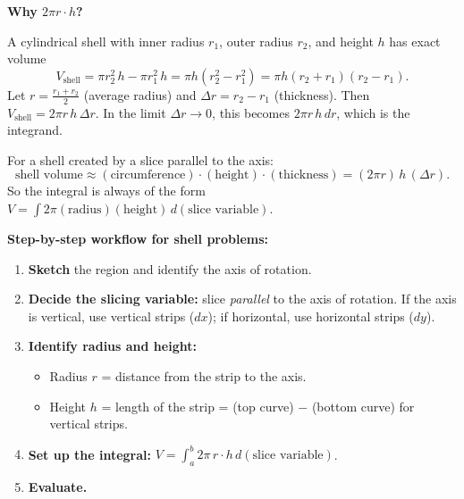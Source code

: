 \textbf{Why $2\pi r\cdot h$?}

A cylindrical shell with inner radius $r_1$, outer radius $r_2$, and height $h$ has exact volume
\[
V_{\text{shell}} = \pi r_2^2\,h - \pi r_1^2\,h = \pi h(r_2^2-r_1^2)=\pi h(r_2+r_1)(r_2-r_1).
\]
Let $r=\frac{r_1+r_2}{2}$ (average radius) and $\Delta r = r_2-r_1$ (thickness). Then $V_{\text{shell}}=2\pi r\,h\,\Delta r$. In the limit $\Delta r\to 0$, this becomes $2\pi r\,h\,dr$, which is the integrand.

\begin{keyformula}[title={Key Formula: Shell Geometry}]
For a shell created by a slice parallel to the axis:
\[
\text{shell volume} \approx (\text{circumference})\cdot(\text{height})\cdot(\text{thickness})
= (2\pi r)\,h\,(\Delta r).
\]
So the integral is always of the form $\displaystyle V=\int 2\pi(\text{radius})(\text{height})\,d(\text{slice variable}).$
\end{keyformula}

\textbf{Step-by-step workflow for shell problems:}
\begin{enumerate}[label=(\arabic*), leftmargin=*]
\item \textbf{Sketch} the region and identify the axis of rotation.
\item \textbf{Decide the slicing variable:} slice \emph{parallel} to the axis of rotation. If the axis is vertical, use vertical strips ($dx$); if horizontal, use horizontal strips ($dy$).
\item \textbf{Identify radius and height:}
\begin{itemize}[leftmargin=2em]
\item Radius $r$ = distance from the strip to the axis.
\item Height $h$ = length of the strip = (top curve) $-$ (bottom curve) for vertical strips.
\end{itemize}
\item \textbf{Set up the integral:} $V = \int_a^b 2\pi\,r\cdot h\,d(\text{slice variable})$.
\item \textbf{Evaluate.}
\end{enumerate}


\begin{center}
\end{center}

